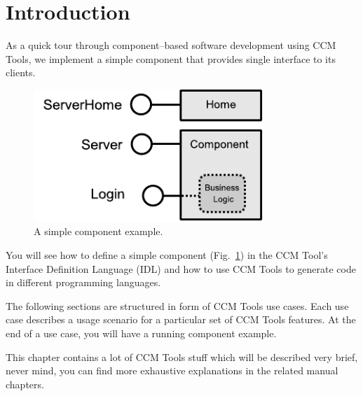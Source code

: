\section{Introduction}
\label{section:Introduction}

As a quick tour through component--based software development using CCM Tools,
we implement a simple component that provides single interface to its clients.

\begin{figure}[htbp]
    \begin{center}
        \includegraphics [height=5cm,angle=0] {figures/LoginComponentExample}
        \caption{ A simple component example.}
        \label{figure:SimpleComponentExample}
    \end{center}
\end{figure}

You will see how to define a simple component
(Fig.~\ref{figure:SimpleComponentExample}) in the CCM Tool's Interface
Definition Language (IDL) and how to use CCM Tools to generate code
in different programming languages.

\vspace{3mm}
The following sections are structured in form of CCM Tools use cases. Each use
case describes a usage scenario for a particular set of CCM Tools features. 
At the end of a use case, you will have a running component example.

\vspace{3mm}
This chapter contains a lot of CCM Tools stuff which will be described very
brief, never mind, you can find more exhaustive 	explanations in the related
manual chapters. 


\newpage


